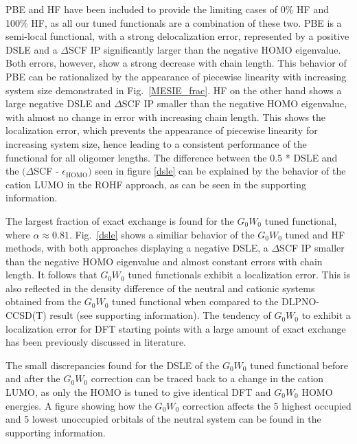 \documentclass[journal=jctcce,manuscript=article,layout=twocolumn]{achemso}
\begin{document}
PBE and HF have been included to provide the limiting cases
of 0\% HF and 100\% HF, as all our tuned functionals are a combination of these two. PBE is a semi-local functional, with a strong delocalization error, represented by a positive DSLE and a $\Delta$SCF IP significantly larger than
the negative HOMO eigenvalue. Both errors, however, show a strong decrease with chain length. 
This behavior of PBE can be  rationalized by the appearance of piecewise linearity with increasing system size demonstrated in Fig.~\ref{MESIE_frac}.
HF on the other hand shows a large negative DSLE and $\Delta$SCF IP smaller than the negative HOMO eigenvalue, with almost no change in error with increasing chain length. This shows the localization
error, which prevents the appearance of piecewise linearity for increasing system size, hence leading to a consistent performance of the functional for all oligomer lengths. 
The difference between the 0.5 * DSLE and the $(\Delta$SCF - $\epsilon_{\mathrm{HOMO}})$ seen in figure \ref{dsle} can be explained by the behavior of the cation LUMO in the ROHF approach, as can be seen in the supporting information. 

The largest fraction of exact exchange is found for the $G_0W_0$ tuned functional, where $\alpha\approx 0.81$. Fig.~\ref{dsle} shows a similiar behavior of the $G_0W_0$ tuned and HF methods, with both approaches displaying a 
negative DSLE, a $\Delta$SCF IP smaller than the negative HOMO eigenvalue and almost constant errors with chain length. It follows that $G_0W_0$ tuned functionals exhibit a localization error.
This is also reflected in the density difference of the neutral and cationic systems obtained from the $G_0W_0$ tuned functional when compared to the DLPNO-CCSD(T) result (see supporting information). The tendency of $G_0W_0$ to exhibit a localization error for DFT starting points with a large amount of exact exchange has been previously discussed in literature.\cite{phys_rev_b_2016_dsle_tuning}

The small discrepancies found for the DSLE of the $G_0W_0$ tuned functional before and after the $G_0W_0$ correction can be traced back to a change in the cation LUMO, as only the HOMO is tuned to give identical DFT and $G_0W_0$ HOMO energies. A figure showing how the $G_0W_0$ correction affects the 5 highest occupied and 5 lowest unoccupied orbitals of the neutral system can be found in the supporting information. 
\end{document}
